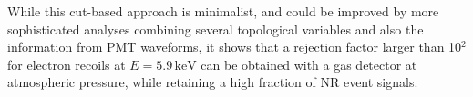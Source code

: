 \documentclass[physics,article,submit,moreauthors,pdftex]{Definitions/mdpi}
\newcommand{\fe}{\ensuremath{^{55}\textrm{Fe}}\xspace}
\newcommand{\ambe}{\ensuremath{\textrm{Am} \textrm{Be}}\xspace}
\newcommand{\keV}{\ensuremath{\,\textrm{keV}}\xspace}
\begin{document}
%






While this cut-based
approach is minimalist, and could be improved by more sophisticated analyses combining several topological variables and also the information from PMT waveforms, it shows
that a rejection factor larger than 10$^2$ for electron recoils at $E=5.9\keV$ can be obtained with a
gas detector at atmospheric pressure, while
retaining a high fraction of NR event signals.


\end{document}
